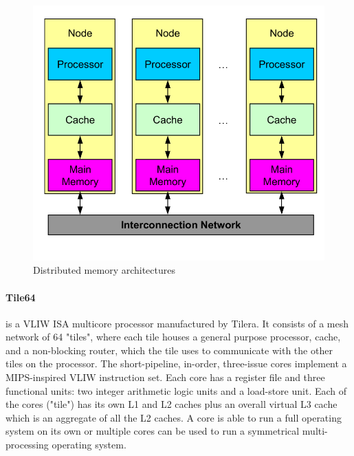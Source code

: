 \begin{figure}[h]
    \centering
    \includegraphics[scale = 0.2]{images/distributed-memory-architectures}
    \caption{Distributed memory architectures}
    \label{fig:distributed-memory-architectures}
\end{figure}

\paragraph{Tile64} is a VLIW ISA multicore processor manufactured by Tilera.
It consists of a mesh network of 64 "tiles", where each tile houses a general purpose processor, cache,
and a non-blocking router, which the tile uses to communicate with the other tiles on the processor.
The short-pipeline, in-order, three-issue cores implement a MIPS-inspired VLIW instruction set.
Each core has a register file and three functional units: two integer arithmetic logic units and a load-store unit.
Each of the cores ("tile") has its own L1 and L2 caches plus an overall virtual L3 cache which is an aggregate of all
the L2 caches.
A core is able to run a full operating system on its own or multiple cores can be used to run a symmetrical
multi-processing operating system.

